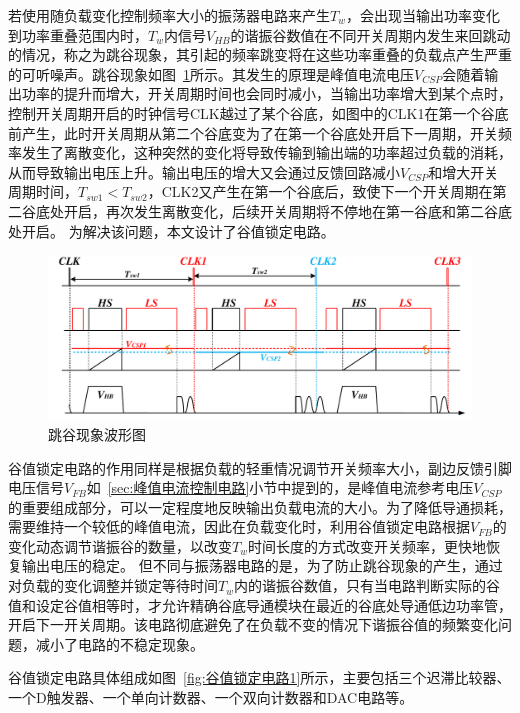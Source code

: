 若使用随负载变化控制频率大小的振荡器电路来产生$T_w$，会出现当输出功率变化到功率重叠范围内时，$T_w$内信号$V_{HB}$的谐振谷数值在不同开关周期内发生来回跳动的情况，称之为跳谷现象，其引起的频率跳变将在这些功率重叠的负载点产生严重的可听噪声。跳谷现象如图~\ref{fig:跳谷现象波形图}所示。其发生的原理是峰值电流电压$V_{CSP}$会随着输出功率的提升而增大，开关周期时间也会同时减小，当输出功率增大到某个点时，控制开关周期开启的时钟信号CLK越过了某个谷底，如图中的CLK1在第一个谷底前产生，此时开关周期从第二个谷底变为了在第一个谷底处开启下一周期，开关频率发生了离散变化，这种突然的变化将导致传输到输出端的功率超过负载的消耗，从而导致输出电压上升。输出电压的增大又会通过反馈回路减小$V_{CSP}$和增大开关周期时间，$T_{sw1}<T_{sw2}$，CLK2又产生在第一个谷底后，致使下一个开关周期在第二谷底处开启，再次发生离散变化，后续开关周期将不停地在第一谷底和第二谷底处开启。
为解决该问题，本文设计了谷值锁定电路。

\begin{figure}[htbp] 
    \centering
    \includegraphics[width=1.0\linewidth]{figures/谷值锁定2.pdf}
    \caption{跳谷现象波形图}
    \label{fig:跳谷现象波形图}
\end{figure} 

谷值锁定电路的作用同样是根据负载的轻重情况调节开关频率大小，副边反馈引脚电压信号$V_{FB}$如~\ref{sec:峰值电流控制电路}小节中提到的，是峰值电流参考电压$V_{CSP}$的重要组成部分，可以一定程度地反映输出负载电流的大小。为了降低导通损耗，需要维持一个较低的峰值电流，因此在负载变化时，利用谷值锁定电路根据$V_{FB}$的变化动态调节谐振谷的数量，以改变$T_w$时间长度的方式改变开关频率，更快地恢复输出电压的稳定。
但不同与振荡器电路的是，为了防止跳谷现象的产生，通过对负载的变化调整并锁定等待时间$T_w$内的谐振谷数值，只有当电路判断实际的谷值和设定谷值相等时，才允许精确谷底导通模块在最近的谷底处导通低边功率管，开启下一开关周期。该电路彻底避免了在负载不变的情况下谐振谷值的频繁变化问题，减小了电路的不稳定现象。

谷值锁定电路具体组成如图~\ref{fig:谷值锁定电路1}所示，主要包括三个迟滞比较器、一个D触发器、一个单向计数器、一个双向计数器和DAC电路等。

